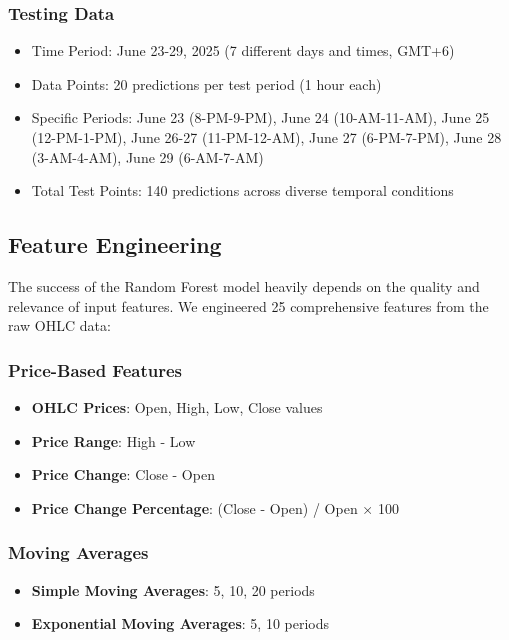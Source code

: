 \documentclass[11pt,a4paper]{article}
\begin{document}
\subsubsection{Testing Data}
\begin{itemize}
    \item Time Period: June 23-29, 2025 (7 different days and times, GMT+6)
    \item Data Points: 20 predictions per test period (1 hour each)
    \item Specific Periods: June 23 (8-PM-9-PM), June 24 (10-AM-11-AM), June 25 (12-PM-1-PM), June 26-27 (11-PM-12-AM), June 27 (6-PM-7-PM), June 28 (3-AM-4-AM), June 29 (6-AM-7-AM)
    \item Total Test Points: 140 predictions across diverse temporal conditions
\end{itemize}

\subsection{Feature Engineering}

The success of the Random Forest model heavily depends on the quality and relevance of input features. We engineered 25 comprehensive features from the raw OHLC data:

\subsubsection{Price-Based Features}
\begin{itemize}
    \item \textbf{OHLC Prices}: Open, High, Low, Close values
    \item \textbf{Price Range}: High - Low
    \item \textbf{Price Change}: Close - Open
    \item \textbf{Price Change Percentage}: (Close - Open) / Open × 100
\end{itemize}

\subsubsection{Moving Averages}
\begin{itemize}
    \item \textbf{Simple Moving Averages}: 5, 10, 20 periods
    \item \textbf{Exponential Moving Averages}: 5, 10 periods
\end{itemize}
\end{document}
